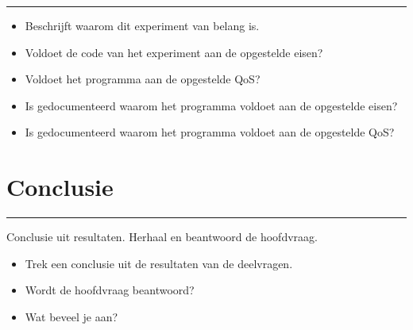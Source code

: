 \documentclass[a4paper, 11pt, oneside]{report}
\begin{document}
\hrule
\begin{itemize}
\item Beschrijft waarom dit experiment van belang is.
\item Voldoet de code van het experiment aan de opgestelde eisen?
\item Voldoet het programma aan de opgestelde QoS?
\item Is gedocumenteerd waarom het programma voldoet aan de opgestelde eisen?
\item Is gedocumenteerd waarom het programma voldoet aan de opgestelde QoS?
\end{itemize}

\chapter{Conclusie}

\hrule
\label{chapter:conclusie}
Conclusie uit resultaten. Herhaal en beantwoord de hoofdvraag.
\begin{itemize}
\item Trek een conclusie uit de resultaten van de deelvragen.
\item Wordt de hoofdvraag beantwoord?
\item Wat beveel je aan?
\end{itemize}





\clearpage
\appendix
\end{document}
